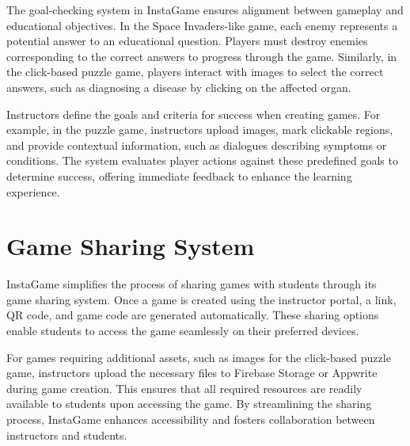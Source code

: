 The goal-checking system in InstaGame ensures alignment between gameplay and educational objectives. In the Space Invaders-like game, each enemy represents a potential answer to an educational question. Players must destroy enemies corresponding to the correct answers to progress through the game. Similarly, in the click-based puzzle game, players interact with images to select the correct answers, such as diagnosing a disease by clicking on the affected organ.

Instructors define the goals and criteria for success when creating games. For example, in the puzzle game, instructors upload images, mark clickable regions, and provide contextual information, such as dialogues describing symptoms or conditions. The system evaluates player actions against these predefined goals to determine success, offering immediate feedback to enhance the learning experience.

\section{Game Sharing System}

InstaGame simplifies the process of sharing games with students through its game sharing system. Once a game is created using the instructor portal, a link, QR code, and game code are generated automatically. These sharing options enable students to access the game seamlessly on their preferred devices.

For games requiring additional assets, such as images for the click-based puzzle game, instructors upload the necessary files to Firebase Storage or Appwrite during game creation. This ensures that all required resources are readily available to students upon accessing the game. By streamlining the sharing process, InstaGame enhances accessibility and fosters collaboration between instructors and students.

